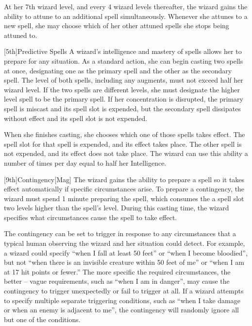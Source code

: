         At her 7th wizard level, and every 4 wizard levels thereafter, the wizard gains the ability to attune to an additional spell simultaneously.
        Whenever she attunes to a new spell, she may choose which of her other attuned spells she stops being attuned to.

        [5th]{Predictive Spells}
        A wizard's intelligence and mastery of spells allows her to prepare for any situation.
        As a standard action, she can begin casting two spells at once, designating one as the primary spell and the other as the secondary spell.
        The level of both spells, including any augments, must not exceed half her wizard level.
        If the two spells are different levels, she must designate the higher level spell to be the primary spell.
        If her concentration is disrupted, the primary spell is miscast and its spell slot is expended, but the secondary spell dissipates without effect and its spell slot is not expended.

        When she finishes casting, she chooses which one of those spells takes effect.
        The spell slot for that spell is expended, and its effect takes place.
        The other spell is not expended, and its effect does not take place.
        The wizard can use this ability a number of times per day equal to half her Intelligence.

        [9th]{Contingency}[Mag]
        The wizard gains the ability to prepare a spell so it takes effect automatically if specific circumstances arise.
        To prepare a contingency, the wizard must spend 1 minute preparing the spell, which consumes the a spell slot two levels higher than the spell's level.
        During this casting time, the wizard specifies what circumstances cause the spell to take effect.

        The contingency can be set to trigger in response to any circumstances that a typical human observing the wizard and her situation could detect.
        For example, a wizard could specify ``when I fall at least 50 feet'' or ``when I become bloodied'', but not ``when there is an invisible creature within 50 feet of me'' or ``when I am at 17 hit points or fewer.'' The more specific the required circumstances, the better -- vague requirements, such as ``when I am in danger'', may cause the contingency to trigger unexpectedly or fail to trigger at all.
        If a wizard attempts to specify multiple separate triggering conditions, such as ``when I take damage or when an enemy is adjacent to me'', the contingency will randomly ignore all but one of the conditions.

